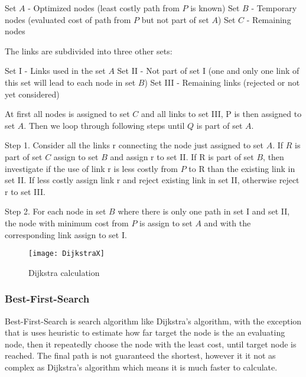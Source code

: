   Set $A$ - Optimized nodes (least costly path from $P$ is known)
  Set $B$ - Temporary nodes (evaluated cost of path from $P$ but not part of set $A$)
  Set $C$ - Remaining nodes

  The links are subdivided into three other sets:

  Set \RN{1} - Links used in the set $A$
  Set \RN{2} - Not part of set I (one and only one link of this set will lead to each node in set $B$)
  Set \RN{3} - Remaining links (rejected or not yet considered)

  At first all nodes is assigned to set $C$ and all links to set \RN{3}, P is then assigned to set $A$.
  Then we loop through following steps until $Q$ is part of set $A$.

  Step 1. Consider all the links r connecting the node just assigned to set $A$. If $R$ is part of set $C$ assign to set $B$ and assign r to set \RN{2}. 
  If R is part of set $B$, then investigate if the use of link r is less costly from $P$ to R than the existing link in set \RN{2}. If less costly assign link r and reject existing link in set \RN{2}, otherwise reject r to set \RN{3}.

  Step 2. For each node in set $B$ where there is only one path in set \RN{1} and set \RN{2}, the node with minimum cost from $P$ is assign to set $A$ and with the corresponding link assign to set \RN{1}.

  \begin{figure}[ht!]
    \centering
    \texttt{[image: DijkstraX]}
    \caption{Dijkstra calculation}
    \label{overflow}
  \end{figure}

  \subsubsection{Best-First-Search}

  Best-First-Search is search algorithm like Dijkstra's algorithm, with the exception that is uses heuristic to estimate how far target the node is the an evaluating node, then it repeatedly choose the node with the least cost, until target node is reached.  The final path is not guaranteed the shortest, however it it not as complex as Dijkstra's algorithm which means it is much faster to calculate. \cite{BestFirst}


